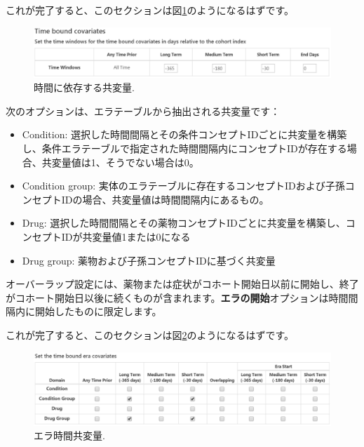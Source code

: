 \documentclass[
  11pt]{book}
\providecommand{\tightlist}{%
  \setlength{\itemsep}{0pt}\setlength{\parskip}{0pt}}
\theoremstyle{definition}
\theoremstyle{definition}
\theoremstyle{definition}
\theoremstyle{definition}
\theoremstyle{remark}
\begin{document}
これが完了すると、このセクションは図\ref{fig:covariateSettings3}のようになるはずです。

\begin{figure}

{\centering \includegraphics[width=1\linewidth]{images/PatientLevelPrediction/covariateSettings3} 

}

\caption{時間に依存する共変量.}\label{fig:covariateSettings3}
\end{figure}

次のオプションは、エラテーブルから抽出される共変量です：

\begin{itemize}
\tightlist
\item
  Condition: 選択した時間間隔とその条件コンセプトIDごとに共変量を構築し、条件エラテーブルで指定された時間間隔内にコンセプトIDが存在する場合、共変量値は1、そうでない場合は0。
\item
  Condition group: 実体のエラテーブルに存在するコンセプトIDおよび子孫コンセプトIDの場合、共変量値は時間間隔内にあるもの。
\item
  Drug: 選択した時間間隔とその薬物コンセプトIDごとに共変量を構築し、コンセプトIDが共変量値1または0になる
\item
  Drug group: 薬物および子孫コンセプトIDに基づく共変量
\end{itemize}

オーバーラップ設定には、薬物または症状がコホート開始日以前に開始し、終了がコホート開始日以後に続くものが含まれます。\textbf{エラの開始}オプションは時間間隔内に開始したものに限定します。

これが完了すると、このセクションは図\ref{fig:covariateSettings4}のようになるはずです。

\begin{figure}

{\centering \includegraphics[width=1\linewidth]{images/PatientLevelPrediction/covariateSettings4} 

}

\caption{エラ時間共変量.}\label{fig:covariateSettings4}
\end{figure}
\end{document}
